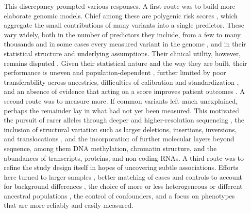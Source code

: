 \documentclass[twocolumn]{article} %
\begin{document}
This discrepancy prompted various responses. A first route was to build more elaborate genomic models. Chief among these are polygenic risk scores \citep[c]{koch2023clinical} \citep[a]{kullo2026clinical}, which aggregate the small contributions of many variants into a single predictor. These vary widely, both in the number of predictors they include, from a few to many thousands and in some cases every measured variant in the genome \citep[d]{koch2023clinical}, and in their statistical structure and underlying assumptions. Their clinical utility, however, remains disputed \citep[e]{koch2023clinical}. Given their statistical nature and the way they are built, their performance is uneven and population-dependent \citep[f]{koch2023clinical} \citep[c]{torkamani2018personal}, further limited by poor transferability across ancestries, difficulties of calibration and standardization \citep[d]{koch2023clinical} \citep[c]{torkamani2018personal}, and an absence of evidence that acting on a score improves patient outcomes \citep[h]{koch2023clinical}. A second route was to measure more. If common variants left much unexplained, perhaps the remainder lay in what had not yet been measured. This motivated the pursuit of rarer alleles through deeper and higher-resolution sequencing \citep[e-f]{manolio2009finding}, the inclusion of structural variation such as larger deletions, insertions, inversions, and translocations \citep[g]{manolio2009finding}, and the incorporation of further molecular layers beyond sequence, among them DNA methylation, chromatin structure, and the abundances of transcripts, proteins, and non-coding RNAs. A third route was to refine the study design itself in hopes of uncovering subtle associations. Efforts here turned to larger samples \citep[b]{wray2013pitfalls}, better matching of cases and controls to account for background differences \citep[h]{manolio2009finding}, the choice of more or less heterogeneous or different ancestral populations \citep[i]{manolio2009finding}, the control of confounders, and a focus on phenotypes that are more reliably and easily measured. 
\end{document}
